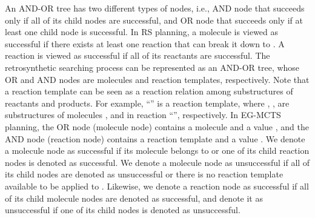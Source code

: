 \documentclass[sn-mathphys,Numbered]{sn-jnl}
\begin{document}
An AND-OR tree has two different types of nodes, i.e., AND node that succeeds only if all of its child nodes are successful, and OR node that succeeds only if at least one child node is successful. In RS planning, a molecule is viewed as successful if there exists at least one reaction that can break it down to . A reaction is viewed as successful if all of its reactants are successful. The retrosynthetic searching process can be represented as an AND-OR tree, whose OR and AND nodes are molecules and reaction templates, respectively. Note that a reaction template can be seen as a reaction relation among substructures of reactants and products. For example, ``'' is a reaction template, where , ,  are substructures of molecules ,  and  in reaction ``'', respectively. 
In EG-MCTS planning, the OR node (molecule node) contains a molecule and a value , and the AND node (reaction node) contains a reaction template and a value . We denote a molecule node  as successful if its molecule belongs to  or one of its child reaction nodes is denoted as successful. We denote a molecule node as unsuccessful if all of its child nodes are denoted as unsuccessful or there is no reaction template available to be applied to . Likewise, we denote a reaction node  as successful if all of its child molecule nodes are denoted as successful, and denote it as unsuccessful if one of its child nodes is denoted as unsuccessful.
\end{document}
